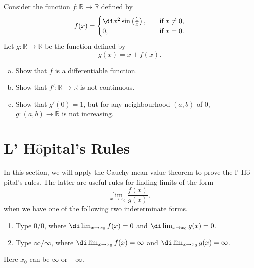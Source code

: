 \atc
 
 
\begin{question}{\themyquestion}
Consider the function $f:\mathbb{R}\to\mathbb{R}$ defined by
\[f(x)=\begin{cases} \di x^2\sin\left(\frac{1}{x}\right),\quad &\text{if}\;x\neq 0,\\
0,\quad &\text{if}\;x= 0.\end{cases}\]Let $g:\mathbb{R}\to\mathbb{R}$ be the function defined by
\[g(x)=x+f(x).\]
\begin{enumerate}[(a)]
\item Show that $f$ is a differentiable function.
\item Show that $f':\mathbb{R}\to\mathbb{R}$ is not continuous.
\item Show that $g'(0)=1$, but for any neighbourhood $(a,b)$ of 0,   $g:(a,b)\to\mathbb{R}$ is not increasing.
\end{enumerate}
\end{question}

 
\vp
\section{L' H$\hat{\text{o}}$pital's Rules}\label{sec3.6}
In this section, we will apply the Cauchy mean value theorem to prove the l' H$\hat{\text{o}}$pital's rules. The latter are useful rules for finding limits of the form
\[\lim_{x\to x_0}\frac{f(x)}{g(x)},\]
when we have one of the following two indeterminate forms.
\begin{enumerate}[1.]
\item Type $0/0$, where
$\di\lim_{x\to x_0}f(x)=0$ and $\di\lim_{x\to x_0}g(x)=0$.
\item Type $\infty/\infty$, where $\di\lim_{x\to x_0}f(x)=\infty$ and $\di\lim_{x\to x_0}g(x)=\infty$.
\end{enumerate}
Here $x_0$ can be $\infty$ or $-\infty$.


